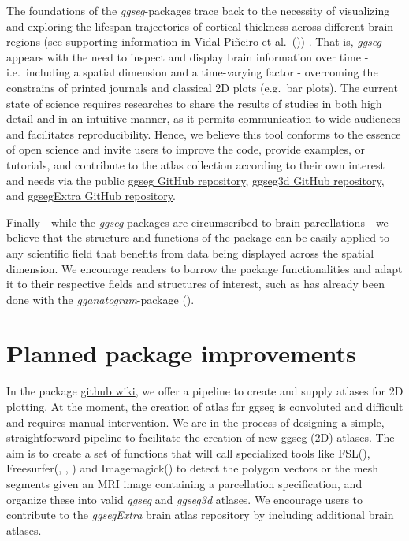 \documentclass[fleqn,10pt]{wlpeerj} %
\begin{document}
The foundations of the \emph{ggseg}-packages trace back to the necessity of visualizing and exploring the lifespan trajectories of cortical thickness across different brain regions (see supporting information in Vidal-Piñeiro et al.~(\citeyearpar{vidal_2019})) .
That is, \emph{ggseg} appears with the need to inspect and display brain information over time - i.e.~including a spatial dimension and a time-varying factor - overcoming the constrains of printed journals and classical 2D plots (e.g.~bar plots).
The current state of science requires researches to share the results of studies in both high detail and in an intuitive manner, as it permits communication to wide audiences and facilitates reproducibility.
Hence, we believe this tool conforms to the essence of open science and invite users to improve the code, provide examples, or tutorials, and contribute to the atlas collection according to their own interest and needs via the public \href{https://github.com/LCBC-UiO/ggseg}{ggseg GitHub repository}, \href{https://github.com/LCBC-UiO/ggseg3d}{ggseg3d GitHub repository}, and \href{https://github.com/LCBC-UiO/ggsegExtra}{ggsegExtra GitHub repository}.

Finally - while the \emph{ggseg}-packages are circumscribed to brain parcellations - we believe that the structure and functions of the package can be easily applied to any scientific field that benefits from data being displayed across the spatial dimension.
We encourage readers to borrow the package functionalities and adapt it to their respective fields and structures of interest, such as has already been done with the \emph{gganatogram}-package (\citet{gganatogram}).

\hypertarget{planned-package-improvements}{%
\section{Planned package improvements}\label{planned-package-improvements}}

In the package \href{https://github.com/LCBC-UiO/ggseg/wiki}{github wiki}, we offer a pipeline to create and supply atlases for 2D plotting.
At the moment, the creation of atlas for ggseg is convoluted and difficult and requires manual intervention.
We are in the process of designing a simple, straightforward pipeline to facilitate the creation of new ggseg (2D) atlases.
The aim is to create a set of functions that will call specialized tools like FSL(\citet{fsl}), Freesurfer(\citet{fischl_99}, \citet{dale_99}, \citet{Fischl2000}) and Imagemagick(\citet{magick}) to detect the polygon vectors or the mesh segments given an MRI image containing a parcellation specification, and organize these into valid \emph{ggseg} and \emph{ggseg3d} atlases.
We encourage users to contribute to the \emph{ggsegExtra} brain atlas repository by including additional brain atlases.
\end{document}
